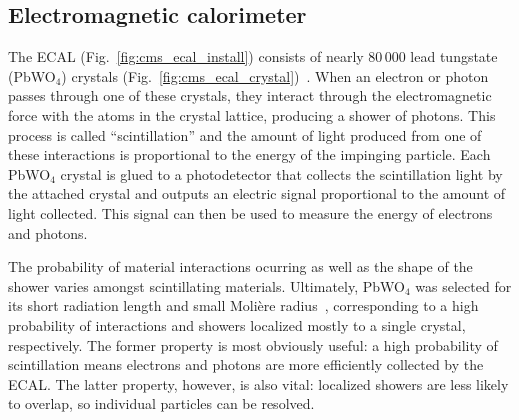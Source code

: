 \subsection{Electromagnetic calorimeter}
The ECAL (Fig.~\ref{fig:cms_ecal_install}) consists of nearly 80\,000 lead tungstate (PbWO$_4$) crystals\footnotemark{} (Fig.~\ref{fig:cms_ecal_crystal})~\cite{CMSWebECAL}. 
When an electron or photon passes through one of these crystals, they interact through the electromagnetic force with the atoms in the crystal lattice, producing a shower of photons. 
This process is called ``scintillation'' and the amount of light produced from one of these interactions is proportional to the energy of the impinging particle. 
Each PbWO$_4$ crystal is glued to a photodetector that collects the scintillation light by the attached crystal and outputs an electric signal proportional to the amount of light collected. 
This signal can then be used to measure the energy of electrons and photons. 

The probability of material interactions ocurring as well as the shape of the shower varies amongst scintillating materials. 
Ultimately, PbWO$_4$ was selected for its short radiation length and small Moli\`ere radius~\cite{CERN-LHCC-97-033}, corresponding to a high probability of interactions and showers localized mostly to a single crystal, respectively. 
The former property is most obviously useful: a high probability of scintillation means electrons and photons are more efficiently collected by the ECAL. 
The latter property, however, is also vital: localized showers are less likely to overlap, so individual particles can be resolved. 


